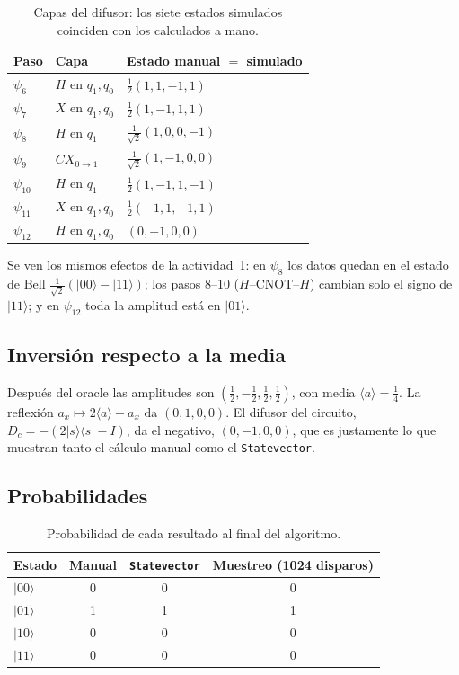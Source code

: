 \documentclass[11pt,a4paper]{article}
\providecommand{\ket}{}\renewcommand{\ket}[1]{\lvert #1\rangle}
\newcommand{\ketbra}[2]{\lvert #1\rangle\!\langle #2\rvert}
\begin{document}
\begin{table}[H]
\centering
\small
\begin{tabular}{@{}lll@{}}
\toprule
Paso & Capa & Estado manual $=$ simulado\\
\midrule
$\psi_6$ & $H$ en $q_1,q_0$ & $\tfrac12(1,1,-1,1)$\\
$\psi_7$ & $X$ en $q_1,q_0$ & $\tfrac12(1,-1,1,1)$\\
$\psi_8$ & $H$ en $q_1$ & $\tfrac1{\sqrt2}(1,0,0,-1)$\\
$\psi_9$ & $CX_{0\to1}$ & $\tfrac1{\sqrt2}(1,-1,0,0)$\\
$\psi_{10}$ & $H$ en $q_1$ & $\tfrac12(1,-1,1,-1)$\\
$\psi_{11}$ & $X$ en $q_1,q_0$ & $\tfrac12(-1,1,-1,1)$\\
$\psi_{12}$ & $H$ en $q_1,q_0$ & $(0,-1,0,0)$\\
\bottomrule
\end{tabular}
\caption{Capas del difusor: los siete estados simulados coinciden con los calculados a mano.}
\end{table}

Se ven los mismos efectos de la actividad~1: en $\psi_8$ los datos quedan en el estado de Bell
$\tfrac1{\sqrt2}(\ket{00}-\ket{11})$; los pasos 8--10 ($H$--CNOT--$H$) cambian solo el signo de $\ket{11}$; y en $\psi_{12}$
toda la amplitud está en $\ket{01}$.

\subsection{Inversión respecto a la media}

Después del oracle las amplitudes son $(\tfrac12,-\tfrac12,\tfrac12,\tfrac12)$, con media $\langle a\rangle=\tfrac14$. La reflexión
$a_x\mapsto 2\langle a\rangle-a_x$ da $(0,1,0,0)$. El difusor del circuito, $D_c=-(2\ketbra ss-I)$, da el negativo,
$(0,-1,0,0)$, que es justamente lo que muestran tanto el cálculo manual como el \texttt{Statevector}.

\subsection{Probabilidades}

\begin{table}[H]
\centering
\small
\begin{tabular}{@{}lccc@{}}
\toprule
Estado & Manual & \texttt{Statevector} & Muestreo (1024 disparos)\\
\midrule
$\ket{00}$ & 0 & 0 & 0\\
$\ket{01}$ & 1 & 1 & 1\\
$\ket{10}$ & 0 & 0 & 0\\
$\ket{11}$ & 0 & 0 & 0\\
\bottomrule
\end{tabular}
\caption{Probabilidad de cada resultado al final del algoritmo.}
\end{table}
\end{document}
